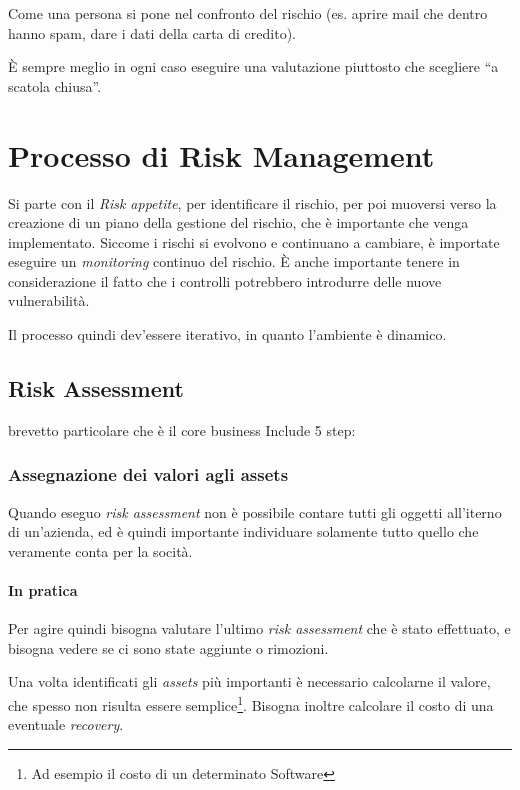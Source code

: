 Come una persona si pone nel confronto del rischio (es. aprire mail che dentro 
hanno spam, dare i dati della carta di credito).

È sempre meglio in ogni caso eseguire una valutazione piuttosto che scegliere 
``a scatola chiusa''.


\section{Processo di Risk Management}

Si parte con il \textit{Risk appetite}, per identificare il rischio, per poi 
muoversi verso la creazione di un piano della gestione del rischio, che è 
importante che venga implementato. Siccome i rischi si evolvono e continuano a 
cambiare, è importate eseguire un \textit{monitoring} continuo del rischio. È 
anche importante tenere in considerazione il fatto che i controlli potrebbero 
introdurre delle nuove vulnerabilità. 

Il processo quindi dev'essere iterativo, in quanto l'ambiente è dinamico.


\subsection{Risk Assessment}
brevetto particolare che è il core business
Include 5 step:

\subsubsection{Assegnazione dei valori agli assets}

Quando eseguo \textit{risk assessment} non è possibile contare tutti gli oggetti 
all'iterno di un'azienda, ed è quindi importante individuare solamente tutto 
quello che veramente conta per la socità.

\paragraph*{In pratica}

Per agire quindi bisogna valutare l'ultimo \textit{risk assessment} che è stato 
effettuato, e bisogna vedere se ci sono state aggiunte o rimozioni.

Una volta identificati gli \textit{assets} più importanti è necessario 
calcolarne il valore, che spesso non risulta essere semplice\footnote{Ad esempio 
il costo di un determinato Software}. Bisogna inoltre calcolare il costo di una 
eventuale \textit{recovery}.




